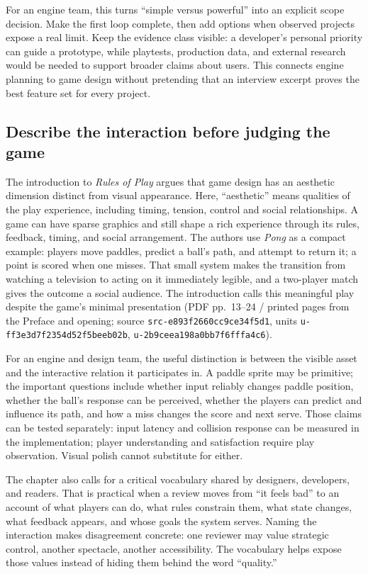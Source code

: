 For an engine team, this turns ``simple versus powerful'' into an explicit scope decision. Make the first loop complete, then add options when observed projects expose a real limit. Keep the evidence class visible: a developer's personal priority can guide a prototype, while playtests, production data, and external research would be needed to support broader claims about users. This connects engine planning to game design without pretending that an interview excerpt proves the best feature set for every project.

\subsection{Describe the interaction before judging the game}\label{describe-the-interaction-before-judging-the-game}

The introduction to \emph{Rules of Play} argues that game design has an aesthetic dimension distinct from visual appearance. Here, ``aesthetic'' means qualities of the play experience, including timing, tension, control and social relationships. A game can have sparse graphics and still shape a rich experience through its rules, feedback, timing, and social arrangement. The authors use \emph{Pong} as a compact example: players move paddles, predict a ball's path, and attempt to return it; a point is scored when one misses. That small system makes the transition from watching a television to acting on it immediately legible, and a two-player match gives the outcome a social audience. The introduction calls this meaningful play despite the game's minimal presentation (PDF pp.~13--24 / printed pages from the Preface and opening; source \texttt{src-e893f2660cc9ce34f5d1}, units \texttt{u-ff3e3d7f2354d52f5beeb02b}, \texttt{u-2b9ceea198a0bb7f6fffa4c6}).

For an engine and design team, the useful distinction is between the visible asset and the interactive relation it participates in. A paddle sprite may be primitive; the important questions include whether input reliably changes paddle position, whether the ball's response can be perceived, whether the players can predict and influence its path, and how a miss changes the score and next serve. Those claims can be tested separately: input latency and collision response can be measured in the implementation; player understanding and satisfaction require play observation. Visual polish cannot substitute for either.

The chapter also calls for a critical vocabulary shared by designers, developers, and readers. That is practical when a review moves from ``it feels bad'' to an account of what players can do, what rules constrain them, what state changes, what feedback appears, and whose goals the system serves. Naming the interaction makes disagreement concrete: one reviewer may value strategic control, another spectacle, another accessibility. The vocabulary helps expose those values instead of hiding them behind the word ``quality.''

